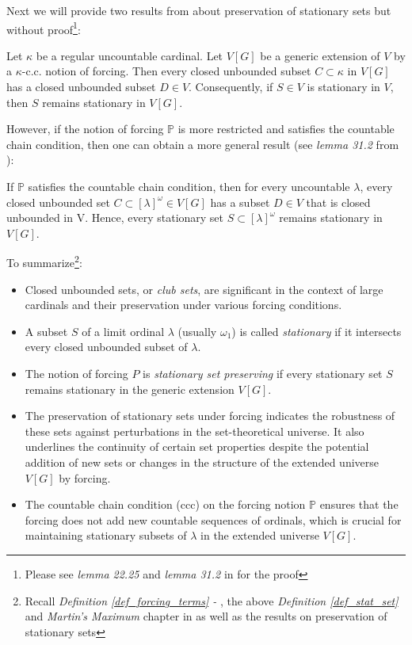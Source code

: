 Next we will provide two results from \cite{jech2003set} about preservation of stationary sets but without proof\footnote{Please see \textit{lemma 22.25} and \textit{lemma 31.2} in \cite{jech2003set} for the proof}:

\begin{lemma}\label{lemma_preserve_stat_in_regular_card}
    Let \(\kappa\) be a regular uncountable cardinal. Let \(V[G]\) be a generic extension of \(V\) by a \(\kappa\)-c.c. notion of forcing. Then every closed unbounded subset \(C \subset \kappa\) in \(V[G]\) has a closed unbounded subset \(D \in V\). Consequently, if \(S \in V\) is stationary in \(V\), then \(S\) remains stationary in \(V[G]\).
\end{lemma}
    
However, if the notion of forcing $\mathbb{P}$ is more restricted and satisfies the countable chain condition, then one can obtain a more general result (see \textit{lemma 31.2} from \cite{jech2003set}):

\begin{lemma}\label{lemma_preserve_stat}
    If $\mathbb{P}$ satisfies the countable chain condition, then for every uncountable $\lambda$, every closed unbounded set $C \subset [\lambda]^\omega \in V[G]$ has a subset $D \in V$ that is closed unbounded in V. Hence, every stationary set $S \subset [\lambda]^\omega$ remains stationary in $V[G]$.
\end{lemma}

To summarize\footnote{Recall \textit{Definition \ref{def_forcing_terms} - }, the above \textit{Definition \ref{def_stat_set}} and \textit{Martin's Maximum} chapter in \cite{jech2003set} as well as the results on preservation of stationary sets}:
\begin{itemize}
    \item Closed unbounded sets, or \textit{club sets}, are significant in the context of large cardinals and their preservation under various forcing conditions.
    \item A subset \(S\) of a limit ordinal \(\lambda\) (usually \(\omega_1\)) is called \textit{stationary} if it intersects every closed unbounded subset of \(\lambda\).
    \item The notion of forcing \(P\) is \textit{stationary set preserving} if every stationary set \(S\) remains stationary in the generic extension \(V[G]\).
    \item The preservation of stationary sets under forcing indicates the robustness of these sets against perturbations in the set-theoretical universe. It also underlines the continuity of certain set properties despite the potential addition of new sets or changes in the structure of the extended universe \(V[G]\) by forcing.
    \item The countable chain condition (ccc) on the forcing notion \(\mathbb{P}\) ensures that the forcing does not add new countable sequences of ordinals, which is crucial for maintaining stationary subsets of \(\lambda\) in the extended universe \(V[G]\).
\end{itemize}





